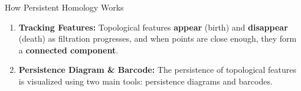 \documentclass[final]{beamer}
\newlength{\colwidth}
\begin{document}
\begin{frame}[t]
\begin{columns}[t]
\begin{column}{\colwidth}
\begin{block} {How Persistent Homology Works}
\begin{enumerate}
        
        
        \item \textbf{Tracking Features:} Topological features \textbf{appear} (birth) and \textbf{disappear} (death) as filtration progresses, and when points are close enough, they form a \textbf{connected component}.
        




        \item \textbf{Persistence Diagram \& Barcode:} The persistence of topological features is visualized using two main tools: persistence diagrams and barcodes. 
        

\end{enumerate}
\end{block}
\end{column}
\end{columns}
\end{frame}
\end{document}
